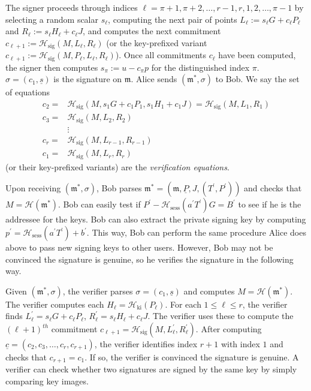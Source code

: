 \documentclass{mrl}
\theoremstyle{definition}
\numberwithin{theorem}{subsection}
\newcommand{\m}{\mathfrak{m}}
\begin{document}
The signer proceeds through indices $\ell=\pi+1, \pi+2, \ldots, r-1, r, 1, 2, \ldots, \pi-1$ 
by selecting a random scalar $s_\ell$, computing the next pair of points $L_\ell := s_\ell G + c_\ell P_\ell$ and $R_\ell := s_\ell H_\ell + c_\ell J$, and computes the next commitment $c_{\ell+1}:=\mathcal{H}_{\text{sig}}(M,L_\ell, R_\ell)$ (or the key-prefixed variant $c_{\ell+1}:=\mathcal{H}_{\text{sig}}(M,P_\ell, L_\ell, R_\ell)$). Once all commitments $c_\ell$ have been computed, the signer then computes $s_{\pi} := u - c_{\pi}p$ for the distinguished index $\pi$.   $\sigma=(c_1, \underline{s})$  is the signature on $\m$. Alice sends $(\m^*, \sigma)$ to Bob. We say the set of equations \begin{align*}
c_2 =& \mathcal{H}_{\text{sig}}(M, s_1 G + c_1 P_1, s_1 H_1 + c_1 J) = \mathcal{H}_{\text{sig}}(M, L_1, R_1)\\
c_3 =& \mathcal{H}_{\text{sig}}(M, L_2, R_2)\\
& \vdots \\
c_r =& \mathcal{H}_{\text{sig}}(M, L_{r-1}, R_{r-1})\\
c_1 =& \mathcal{H}_{\text{sig}}(M, L_r, R_r)
\end{align*} (or their key-prefixed variants) are the \textit{verification equations}.

Upon receiving $(\m^*, \sigma)$, Bob parses $\m^* = (\m, \underline{P}, J, (T^\prime, P^\prime))$ and checks that $M = \mathcal{H}(\m^*)$. Bob can easily test if $P^{\prime} - \mathcal{H}_{\text{sess}}(a^\prime T^\prime)G = B^\prime$ to see if he is the addressee for the keys. Bob can also extract the private signing key by computing $p^\prime = \mathcal{H}_{\text{sess}}(a^\prime T^\prime) + b^\prime$. This way, Bob can perform the same procedure Alice does above to pass new signing keys to other users. However, Bob may not be convinced the signature is genuine, so he verifies the signature in the following way.

Given $(\m^*, \sigma)$, the verifier parses $\sigma = (c_1, \underline{s})$ and computes $M = \mathcal{H}(\m^*)$. The verifier computes each $H_\ell = \mathcal{H}_{\text{ki}}(P_\ell)$. For each $1 \leq \ell \leq r$, the verifier finds $L_{\ell}^{\prime} = s_\ell G + c_\ell P_\ell$, $R_{\ell}^{\prime} = s_\ell H_\ell + c_\ell J$. The verifier uses these to compute the $(\ell+1)^{th}$ commitment $c_{\ell+1} = \mathcal{H}_{\text{sig}}(M, L_{\ell}^{\prime}, R_{\ell}^{\prime})$. After computing $\underline{c} = (c_2, c_3, \ldots, c_r, c_{r+1})$, the verifier identifies index $r+1$ with index $1$ and checks that $c_{r+1} = c_1$. If so, the verifier is convinced the signature is genuine. A verifier can check whether two signatures are signed by the same key by simply comparing key images.
\end{document}
